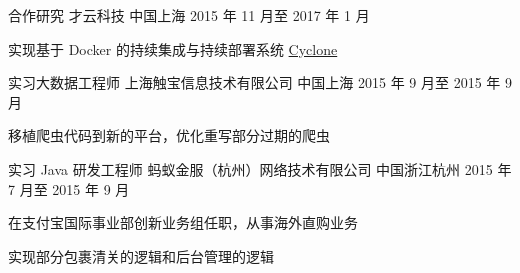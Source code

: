 \begin{cventries}
  \cventry
    {合作研究} %
    {才云科技} %
    {中国上海} %
    {2015 年 11 月至 2017 年 1 月} %
    {
      \begin{cvitems} %
        \item 实现基于 Docker 的持续集成与持续部署系统 \href{https://github.com/caicloud/cyclone}{Cyclone}
      \end{cvitems}
    }

  \cventry
    {实习大数据工程师} %
    {上海触宝信息技术有限公司} %
    {中国上海} %
    {2015 年 9 月至 2015 年 9 月} %
    {
      \begin{cvitems} %
        \item 移植爬虫代码到新的平台，优化重写部分过期的爬虫
      \end{cvitems}
    }

  \cventry
    {实习 Java 研发工程师} %
    {蚂蚁金服（杭州）网络技术有限公司} %
    {中国浙江杭州} %
    {2015 年 7 月至 2015 年 9 月} %
    {
      \begin{cvitems} %
        \item 在支付宝国际事业部创新业务组任职，从事海外直购业务
        \item 实现部分包裹清关的逻辑和后台管理的逻辑
      \end{cvitems}
    }

\end{cventries}

